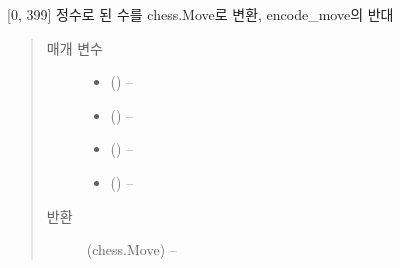 \documentclass[letterpaper,10pt,english]{sphinxmanual}
\begin{document}
\begin{fulllineitems}
\label{\detokenize{agents.self_learning:agents.self_learning.utils.decode_move}}
{[}0, 399{]} 정수로 된 수를 chess.Move로 변환, encode\_move의 반대
\begin{quote}\begin{description}
\item[{매개 변수}] \leavevmode\begin{itemize}
\item {} 
 ({\hyperref[\detokenize{scripts:scripts.run_game.State}]{}}) -- 

\item {} 
 () -- 

\item {} 
 () -- 

\item {} 
 () -- 

\end{itemize}

\item[{반환}] \leavevmode
(chess.Move) --

\end{description}\end{quote}

\end{fulllineitems}

\end{document}
